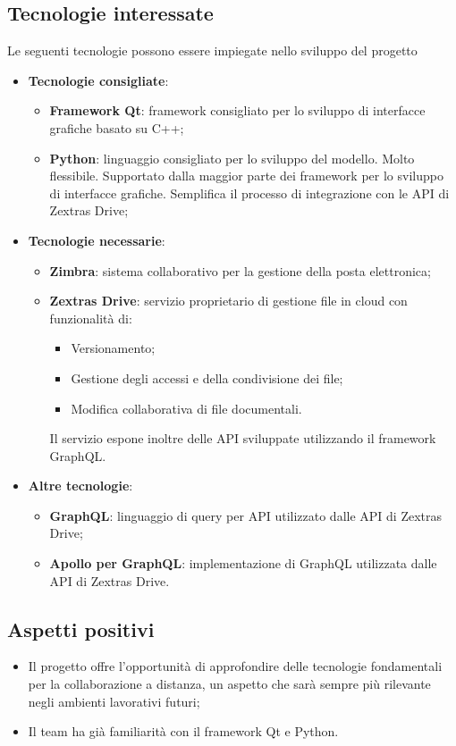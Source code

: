 \subsection{Tecnologie interessate}
Le seguenti tecnologie possono essere impiegate nello sviluppo del progetto
\begin{itemize}
\item \textbf{Tecnologie consigliate}:
\begin{itemize}
    \item \textbf{Framework Qt}: framework consigliato per lo sviluppo di interfacce grafiche basato su C++;
    \item \textbf{Python}: linguaggio consigliato per lo sviluppo del modello. Molto flessibile. Supportato dalla maggior parte dei framework per lo sviluppo di interfacce grafiche. 
    Semplifica il processo di integrazione con le API di Zextras Drive;
    \end{itemize}
\newpage
\item \textbf{Tecnologie necessarie}:
    \begin{itemize}
    \item \textbf{Zimbra}: sistema collaborativo per la gestione della posta elettronica;
    \item \textbf{Zextras Drive}: servizio proprietario di gestione file in cloud con funzionalità di:
        \begin{itemize}
        \item Versionamento;
        \item Gestione degli accessi e della condivisione dei file;
        \item Modifica collaborativa di file documentali.
        \end{itemize}
    Il servizio espone inoltre delle API sviluppate utilizzando il framework GraphQL.
\end{itemize}
\item \textbf{Altre tecnologie}:
    \begin{itemize}
    \item \textbf{GraphQL}: linguaggio di query per API utilizzato dalle API di Zextras Drive;
    \item \textbf{Apollo per GraphQL}: implementazione di GraphQL utilizzata dalle API di Zextras Drive.
    \end{itemize}
\end{itemize}

\subsection{Aspetti positivi}
\begin{itemize}
\item Il progetto offre l'opportunità di approfondire delle tecnologie fondamentali per la collaborazione a distanza, un aspetto che sarà sempre più rilevante negli ambienti lavorativi futuri;
\item Il team ha già familiarità con il framework Qt e Python.
\end{itemize}

